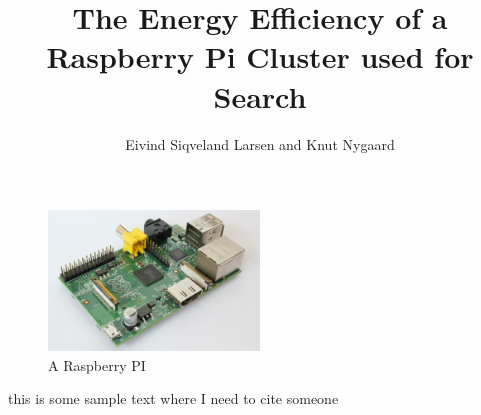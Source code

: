 \documentclass[a4paper, 12pt]{article}
\title{The Energy Efficiency of a Raspberry Pi Cluster used for Search}
\author{Eivind Siqveland Larsen and Knut Nygaard}
\begin{document}
\maketitle


\begin{figure}
    \centering
    \includegraphics[width=0.5\textwidth]{hardware/RaspberryPi}
    \caption{A Raspberry PI}
    \label{fig:raspberrypi_hw}
\end{figure}

\tableofcontents


this is some sample text where I need to cite someone \cite{BEOwulf}











\end{document}
